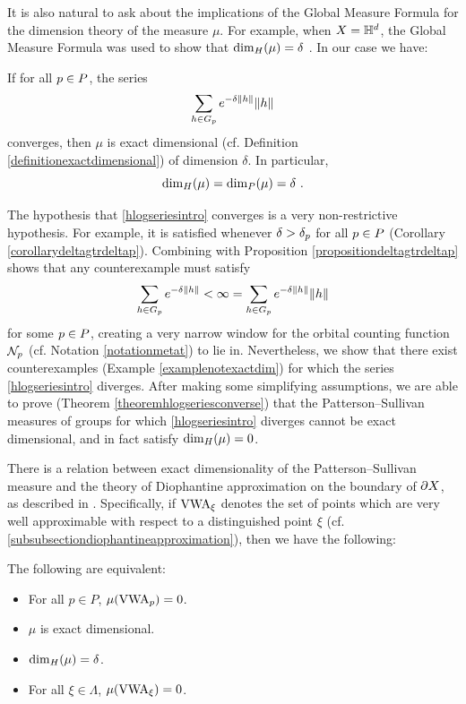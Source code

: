 It is also natural to ask about the implications of the Global Measure Formula for the dimension theory of the measure $\mu$. For example, when $X = \H^d$, the Global Measure Formula was used to show that ${\dim_H}(\mu) = \delta$ \cite[Proposition 4.10]{StratmannVelani}. In our case we have: 
\begin{theorem}
\label{theoremhlogseriesintro}
If for all $p\in P$, the series
\begin{equation}
\label{hlogseriesintro}
\sum_{h\in G_p} e^{-\delta\|h\|} \|h\|
\end{equation}
converges, then $\mu$ is exact dimensional (cf. Definition \ref{definitionexactdimensional}) of dimension $\delta$. In particular, 
\[
{\dim_H}(\mu) = {\dim_P}(\mu) = \delta ~.
\]
\end{theorem}
The hypothesis that \eqref{hlogseriesintro} converges is a very non-restrictive hypothesis. For example, it is satisfied whenever $\delta > \delta_p$ for all $p\in P$ (Corollary \ref{corollarydeltagtrdeltap}). Combining with Proposition \ref{propositiondeltagtrdeltap} shows that any counterexample must satisfy
\[
\sum_{h\in G_p} e^{-\delta\|h\|} < \infty = \sum_{h\in G_p} e^{-\delta\|h\|} \|h\|
\]
for some $p\in P$, creating a very narrow window for the orbital counting function $\mathcal N_p$ (cf. Notation \ref{notationmetat}) to lie in. Nevertheless, we show that there exist counterexamples (Example \ref{examplenotexactdim}) for which the series \eqref{hlogseriesintro} diverges. After making some simplifying assumptions, we are able to prove (Theorem \ref{theoremhlogseriesconverse}) that the Patterson--Sullivan measures of groups for which \eqref{hlogseriesintro} diverges cannot be exact dimensional, and in fact satisfy ${\dim_H}(\mu) = 0$.

There is a relation between exact dimensionality of the Patterson--Sullivan measure and the theory of Diophantine approximation on the boundary of $\partial X$, as described in \cite{FSU4}. Specifically, if $\mathrm{VWA}_\xi$ denotes the set of points which are very well approximable with respect to a distinguished point $\xi$ (cf. \6\ref{subsubsectiondiophantineapproximation}), then we have the following:

\begin{theorem}
\label{theoremequivalentVWAintro}
The following are equivalent:
\begin{itemize}
\item[(A)] For all $p \in P$, $\mu(\mathrm{VWA}_p) = 0$.
\item[(B)] $\mu$ is exact dimensional.
\item[(C)] ${\dim_H}(\mu) = \delta$.
\item[(D)] For all $\xi \in \Lambda$, $\mu(\mathrm{VWA}_\xi) = 0$.
\end{itemize}
\end{theorem}

